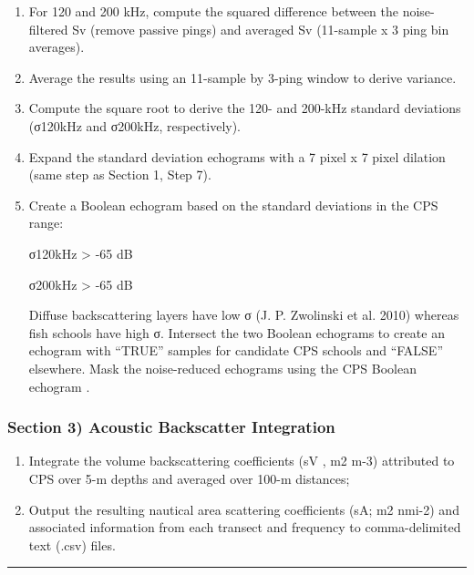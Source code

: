 \documentclass[
  letterpaper,
  oneside,
  open=any]{scrbook}
\providecommand{\tightlist}{%
  \setlength{\itemsep}{0pt}\setlength{\parskip}{0pt}}\usepackage{longtable,booktabs,array}
\begin{document}
\begin{enumerate}
\def\labelenumi{\arabic{enumi}.}
\item
  For 120 and 200 kHz, compute the squared difference between the
  noise-filtered Sv (remove passive pings) and averaged Sv (11-sample x
  3 ping bin averages).
\item
  Average the results using an 11-sample by 3-ping window to derive
  variance.
\item
  Compute the square root to derive the 120- and 200-kHz standard
  deviations (σ120kHz and σ200kHz, respectively).
\item
  Expand the standard deviation echograms with a 7 pixel x 7 pixel
  dilation (same step as Section 1, Step 7).
\item
  Create a Boolean echogram based on the standard deviations in the CPS
  range:

  σ120kHz \textgreater{} -65 dB

  σ200kHz \textgreater{} -65 dB

  Diffuse backscattering layers have low σ (J. P. Zwolinski et al. 2010)
  whereas fish schools have high σ. Intersect the two Boolean echograms
  to create an echogram with ``TRUE'' samples for candidate CPS schools
  and ``FALSE'' elsewhere. Mask the noise-reduced echograms using the
  CPS Boolean echogram .
\end{enumerate}

\subsubsection{\texorpdfstring{\textbf{Section 3) Acoustic Backscatter
Integration}}{Section 3) Acoustic Backscatter Integration}}\label{section-3-acoustic-backscatter-integration}

\begin{enumerate}
\def\labelenumi{\arabic{enumi}.}
\tightlist
\item
  Integrate the volume backscattering coefficients (sV , m2 m-3)
  attributed to CPS over 5-m depths and averaged over 100-m distances;
\item
  Output the resulting nautical area scattering coefficients (sA; m2
  nmi-2) and associated information from each transect and frequency to
  comma-delimited text (.csv) files.
\end{enumerate}

\begin{center}\rule{0.5\linewidth}{0.5pt}\end{center}
\end{document}

